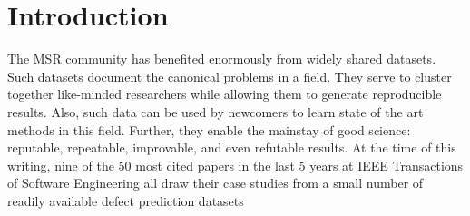 \documentclass[sigconf,anonymous,review]{acmart}
\newcommand\TODO[1]{\textcolor{ScarletRed}{\textbf{\colorbox{yellow}{\small TODO:}} \emph{#1}}\xspace}
\begin{document}
%
%



\keywords{}


\maketitle
% 





\section{Introduction}


The MSR  community has benefited enormously from widely shared datasets.  Such datasets document the canonical problems in a field.
They serve to cluster together like-minded researchers while allowing them to generate reproducible results. Also, such data can be used by
   newcomers to learn state of the art methods in this field. Further, they enable the mainstay of good science:
reputable, repeatable,  improvable, and even refutable results.
At the time of this writing,   nine of the 50 most cited papers in the last 5 years at IEEE Transactions of Software Engineering {all draw their case studies
from a small number of readily available defect prediction datasets} 
\end{document}
